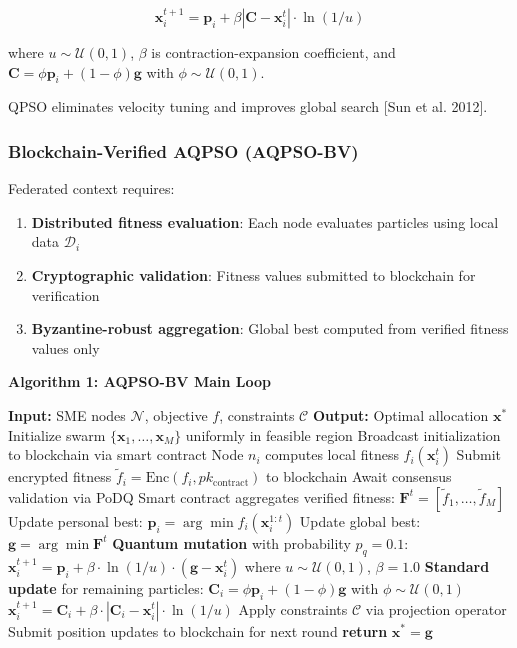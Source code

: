 \documentclass[times,10pt,twocolumn]{jucs2e}
\begin{document}
\begin{equation}
\mathbf{x}_i^{t+1} = \mathbf{p}_i + \beta |\mathbf{C} - \mathbf{x}_i^t| \cdot \ln(1/u)
\end{equation}

where $u \sim \mathcal{U}(0,1)$, $\beta$ is contraction-expansion coefficient, and $\mathbf{C} = \phi \mathbf{p}_i + (1-\phi) \mathbf{g}$ with $\phi \sim \mathcal{U}(0,1)$.

QPSO eliminates velocity tuning and improves global search [Sun et al. 2012].

\subsubsection{Blockchain-Verified AQPSO (AQPSO-BV)}

Federated context requires:
\begin{enumerate}
\item \textbf{Distributed fitness evaluation}: Each node evaluates particles using local data $\mathcal{D}_i$
\item \textbf{Cryptographic validation}: Fitness values submitted to blockchain for verification
\item \textbf{Byzantine-robust aggregation}: Global best computed from verified fitness values only
\end{enumerate}

\textbf{Algorithm 1: AQPSO-BV Main Loop}

\begin{algorithmic}[1]
\STATE \textbf{Input:} SME nodes $\mathcal{N}$, objective $f$, constraints $\mathcal{C}$
\STATE \textbf{Output:} Optimal allocation $\mathbf{x}^*$
\STATE Initialize swarm $\{\mathbf{x}_1, \ldots, \mathbf{x}_M\}$ uniformly in feasible region
\STATE Broadcast initialization to blockchain via smart contract
        \STATE Node $n_i$ computes local fitness $f_i(\mathbf{x}_i^t)$
        \STATE Submit encrypted fitness $\tilde{f}_i = \text{Enc}(f_i, pk_{\text{contract}})$ to blockchain
        \STATE Await consensus validation via PoDQ
    \ENDFOR
    \STATE Smart contract aggregates verified fitness: $\mathbf{F}^t = [\tilde{f}_1, \ldots, \tilde{f}_M]$
    \STATE Update personal best: $\mathbf{p}_i = \arg\min f_i(\mathbf{x}_i^{1:t})$
    \STATE Update global best: $\mathbf{g} = \arg\min \mathbf{F}^t$
    \STATE \textbf{Quantum mutation} with probability $p_q = 0.1$:
        \STATE $\mathbf{x}_i^{t+1} = \mathbf{p}_i + \beta \cdot \ln(1/u) \cdot (\mathbf{g} - \mathbf{x}_i^t)$
        \STATE where $u \sim \mathcal{U}(0,1)$, $\beta = 1.0$
    \ENDFOR
    \STATE \textbf{Standard update} for remaining particles:
    \STATE $\mathbf{C}_i = \phi \mathbf{p}_i + (1-\phi) \mathbf{g}$ with $\phi \sim \mathcal{U}(0,1)$
    \STATE $\mathbf{x}_i^{t+1} = \mathbf{C}_i + \beta \cdot |\mathbf{C}_i - \mathbf{x}_i^t| \cdot \ln(1/u)$
    \STATE Apply constraints $\mathcal{C}$ via projection operator
    \STATE Submit position updates to blockchain for next round
\ENDFOR
\STATE \textbf{return} $\mathbf{x}^* = \mathbf{g}$
\end{algorithmic}
\end{document}
